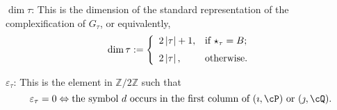 \documentclass[12pt,a4paper]{amsart}
\def\abs#1{\left|{#1}\right|}
\newcommand{\Z}{\mathbb{Z}}
\numberwithin{equation}{section}
\theoremstyle{remark}
\begin{document}
\smallskip


 \smallskip

  \noindent $\dim \tau$:
This is the dimension of the standard representation of the complexification of $G_\tau$, or equivalently, 
 \[
 \dim \tau:= \left\{
     \begin{array}{ll}
          2\abs{ \tau}+1, &\hbox{if $\star_\tau=B$}; \medskip\\
         2 \abs{\tau}, &\hbox{otherwise}.
            \end{array}
   \right.
 \]

\smallskip


 \smallskip

  \noindent $\varepsilon_\tau$:
This is the element in $\Z/2\Z$ such that 
\[
  \varepsilon_\tau=0\Leftrightarrow  \textrm{the symbol $d$ occurs in the first column of $( \imath, \cP)$ or $(\jmath, \cQ)$}. 
\]

 \smallskip
\end{document}
